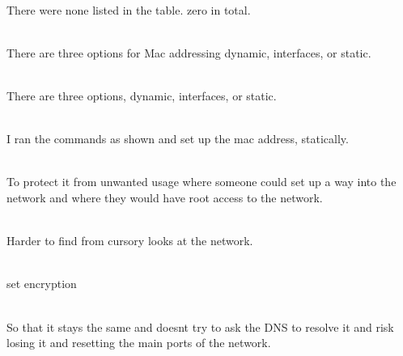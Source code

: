 \documentclass[../EngineeringJournal_CDavis.tex]{subfiles}
\begin{document}
\clearpage



\\
There were none listed in the table. zero in total. 


\noindent{}\\
There are three options for Mac addressing dynamic, interfaces, or static.


\noindent{}\\
There are three options, dynamic, interfaces, or static.


\noindent{}\\
I ran the commands as shown and set up the mac address, statically.


\\
To protect it from unwanted usage where someone could set up a way into the
network and where they would have root access to the network.


\noindent{}\\
Harder to find from cursory looks at the network.


\noindent{}\\
set encryption
\hfill\break

\noindent{}\\
So that it stays the same and doesnt try to ask the DNS to resolve it and
risk losing it and resetting the main ports of the network.


\end{document}

